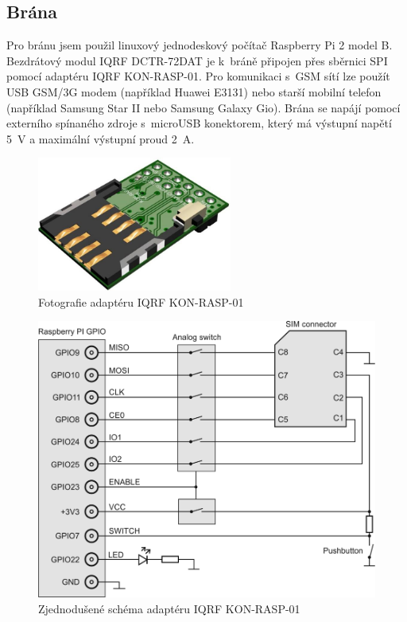 \documentclass[12pt,a4paper,oneside]{article}
\begin{document}
\subsection{Brána}

Pro bránu jsem použil linuxový jednodeskový počítač Raspberry Pi 2 model B. Bezdrátový modul IQRF DCTR-72DAT je k~bráně připojen přes sběrnici SPI pomocí adaptéru IQRF KON-RASP-01. Pro komunikaci s~GSM sítí lze použít USB GSM/3G modem (například Huawei E3131) nebo starší mobilní telefon (například Samsung Star II nebo Samsung Galaxy Gio). Brána se napájí pomocí externího spínaného zdroje s~microUSB konektorem, který má výstupní napětí 5~V a maximální výstupní proud 2~A.

\begin{figure}[H]
\centering
\label{fig:iqrf/fotka}
\includegraphics[width = 64mm]{img/iqrf/kon-rasp-01.png}
\caption{Fotografie adaptéru IQRF KON-RASP-01}
\end{figure}

\begin{figure}[H]
\centering
\label{fig:iqrf/zjednodusene-schema}
\includegraphics[width = 128mm]{img/iqrf/kon-rasp-01-zjednodusene-schema.png}
\caption{Zjednodušené schéma adaptéru IQRF KON-RASP-01}
\end{figure}
\end{document}
